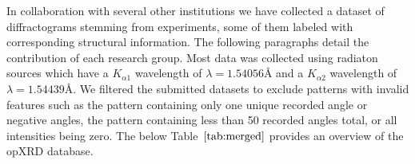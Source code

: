 In collaboration with several other institutions we have collected a dataset of diffractograms stemming from experiments, some of them labeled with corresponding structural information. The following paragraphs detail the contribution of each research group. Most data was collected using  radiaton sources which have a  $K_{\alpha1}$ wavelength of $\lambda=1.54056\text{\AA}$ and a $K_{\alpha2}$ wavelength of $\lambda=1.54439\text{\AA}$. We filtered the submitted datasets to exclude patterns with invalid features such as the pattern containing only one unique recorded angle or negative angles, the pattern containing less than 50 recorded angles total, or all intensities being zero. The below Table~$\eqref{tab:merged}$ provides an overview of the opXRD database. 

\begin{table}[!htb]
\centering
\caption{\footnotesize The opXRD database: The availability of the chemical composition, spacegroups, lattice parameters, and atomic coordinates of the underlying samples are indicated by the columns ``Comp.'', ``Spg.'', ``Lattice'' and ``Atom coords.'' respectively.}
\label{tab:merged}
\end{table}

